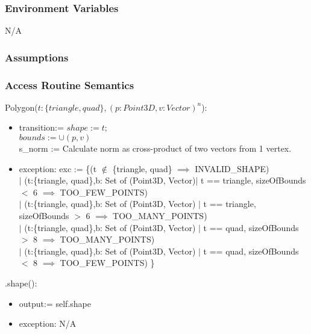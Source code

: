 \documentclass[12pt, titlepage]{article}
\begin{document}
\subsubsection{Environment Variables}
N/A

\subsubsection{Assumptions}

\subsubsection{Access Routine Semantics}
\noindent Polygon($t:\{triangle, quad\}, (p:Point3D, v:Vector)^n$):
\begin{itemize}
	\item transition:= $shape := t;$ \\
	$bounds := \cup (p,v)$ \\
	s\_norm := Calculate norm as cross-product of two vectors from 1
        vertex.  
	\item exception: exc := \{(t $\notin$ \{triangle, quad\} $\implies$ 
	INVALID\_SHAPE) \\ $|$ (t:\{triangle, quad\},b: Set of (Point3D, Vector)$|$ 
	t == triangle, sizeOfBounds $<$ 6 $\implies$ TOO\_FEW\_POINTS) \\ $|$ 
	(t:\{triangle, quad\},b: Set of (Point3D, Vector) $|$ t == triangle, 
	sizeOfBounds $>$ 6 $\implies$ TOO\_MANY\_POINTS) \\ $|$ 
	(t:\{triangle, quad\},b: Set of (Point3D, Vector) $|$ t == quad, 
	sizeOfBounds $>$ 8 $\implies$ TOO\_MANY\_POINTS) \\ $|$ 
	(t:\{triangle, quad\},b: Set of (Point3D, Vector) $|$ t == quad, 
	sizeOfBounds $<$ 8 $\implies$ TOO\_FEW\_POINTS)  \}\\
\end{itemize}

\noindent .shape():
\begin{itemize}
	\item output:= self.shape
	\item exception: N/A
\end{itemize}
\end{document}
